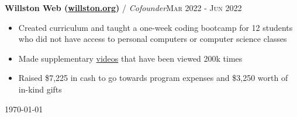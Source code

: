 \documentclass[12pt, a4paper]{article}
\begin{document}


\textbf{Willston Web (\href{https://willston.org}{willston.org})} / \textit{Cofounder}\hfill\textsc{Mar 2022 - Jun 2022}\\
\begin{itemize}
    \vspace{-8mm}
    \item Created curriculum and taught a one-week coding bootcamp for 12 students who did not have access to personal computers or computer science classes
    \item Made supplementary \href{https://youtube.com/JonathanBuchh}{videos} that have been viewed 200k times
    \item Raised \$7,225 in cash to go towards program expenses and \$3,250 worth of in-kind gifts
\end{itemize}




\vspace{-6mm}
\begin{center}
{\scriptsize\today\- }
\end{center}
\end{document}
